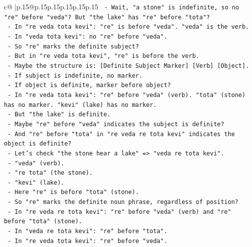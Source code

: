 \documentclass{article}
\begin{document}
{\begin{supertabular}{c@{$\;$}|p{.15\linewidth}@{}p{.15\linewidth}p{.15\linewidth}p{.15\linewidth}p{.15\linewidth}p{.15\linewidth}}
{{{\texttt{                   {-} Wait, "a stone" is indefinite, so no "re" before "veda"? But "the lake" has "re" before "tota"?} \\
\texttt{                   {-} In "re veda tota kevi": "re" is before "veda". "veda" is the verb.} \\
\texttt{                   {-} In "veda tota kevi": no "re" before "veda".} \\
\texttt{                   {-} So "re" marks the definite subject?} \\
\texttt{                   {-} But in "re veda tota kevi", "re" is before the verb.} \\
\texttt{                   {-} Maybe the structure is: {[}Definite Subject Marker{]} {[}Verb{]} {[}Object{]}.} \\
\texttt{                   {-} If subject is indefinite, no marker.} \\
\texttt{                   {-} If object is definite, marker before object?} \\
\texttt{                   {-} In "re veda tota kevi": "re" before "veda" (verb). "tota" (stone) has no marker. "kevi" (lake) has no marker.} \\
\texttt{                   {-} But "the lake" is definite.} \\
\texttt{                   {-} Maybe "re" before "veda" indicates the subject is definite?} \\
\texttt{                   {-} And "re" before "tota" in "re veda re tota kevi" indicates the object is definite?} \\
\texttt{                   {-} Let's check "the stone hear a lake" => "veda re tota kevi".} \\
\texttt{                     {-} "veda" (verb).} \\
\texttt{                     {-} "re tota" (the stone).} \\
\texttt{                     {-} "kevi" (lake).} \\
\texttt{                     {-} Here "re" is before "tota" (stone).} \\
\texttt{                     {-} So "re" marks the definite noun phrase, regardless of position?} \\
\texttt{                     {-} In "re veda re tota kevi": "re" before "veda" (verb) and "re" before "tota" (stone).} \\
\texttt{                     {-} In "veda re tota kevi": "re" before "tota".} \\
\texttt{                     {-} In "re veda tota kevi": "re" before "veda".} \\
}}}
\end{supertabular}}
\end{document}

